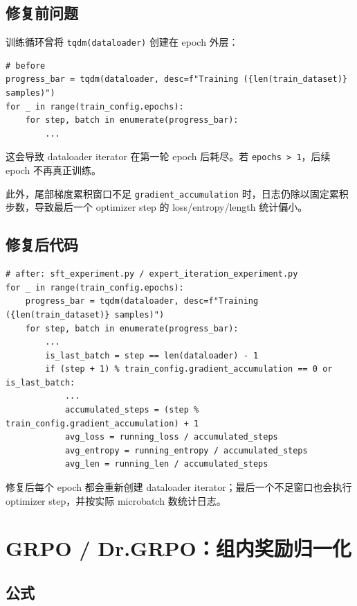 \documentclass[UTF8,a4paper,11pt]{ctexart}
\begin{document}
\subsection{修复前问题}

训练循环曾将 \texttt{tqdm(dataloader)} 创建在 epoch 外层：

\begin{lstlisting}
# before
progress_bar = tqdm(dataloader, desc=f"Training ({len(train_dataset)} samples)")
for _ in range(train_config.epochs):
    for step, batch in enumerate(progress_bar):
        ...
\end{lstlisting}

这会导致 dataloader iterator 在第一轮 epoch 后耗尽。若 \texttt{epochs > 1}，后续 epoch 不再真正训练。

此外，尾部梯度累积窗口不足 \texttt{gradient\_accumulation} 时，日志仍除以固定累积步数，导致最后一个 optimizer step 的 loss/entropy/length 统计偏小。

\subsection{修复后代码}

\begin{lstlisting}
# after: sft_experiment.py / expert_iteration_experiment.py
for _ in range(train_config.epochs):
    progress_bar = tqdm(dataloader, desc=f"Training ({len(train_dataset)} samples)")
    for step, batch in enumerate(progress_bar):
        ...
        is_last_batch = step == len(dataloader) - 1
        if (step + 1) % train_config.gradient_accumulation == 0 or is_last_batch:
            ...
            accumulated_steps = (step % train_config.gradient_accumulation) + 1
            avg_loss = running_loss / accumulated_steps
            avg_entropy = running_entropy / accumulated_steps
            avg_len = running_len / accumulated_steps
\end{lstlisting}

修复后每个 epoch 都会重新创建 dataloader iterator；最后一个不足窗口也会执行 optimizer step，并按实际 microbatch 数统计日志。

\section{GRPO / Dr.GRPO：组内奖励归一化}

\subsection{公式}
\end{document}
